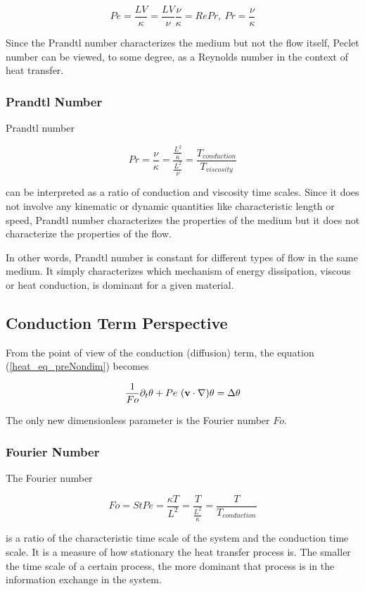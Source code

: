 $$ Pe = \frac{LV}{\kappa} = \frac{LV}{\nu} \frac{\nu}{\kappa} = RePr, ~ Pr = \frac{\nu}{\kappa} $$

Since the Prandtl number characterizes the medium but not the flow itself, Peclet number can be viewed, to some degree, as a Reynolds number in the context of heat transfer.

\subsubsection{Prandtl Number}

Prandtl number

$$ Pr = \frac{\nu}{\kappa} = \frac{\frac{L^2}{\kappa}}{\frac{L^2}{\nu}} = \frac{T_{conduction}}{T_{viscosity}} $$

can be interpreted as a ratio of conduction and viscosity time scales. Since it does not involve any kinematic or dynamic quantities like characteristic length or speed, Prandtl number characterizes the properties of the medium but it does not characterize the properties of the flow. 

In other words, Prandtl number is constant for different types of flow in the same medium. It simply characterizes which mechanism of energy dissipation, viscous or heat conduction, is dominant for a given material.

\subsection{Conduction Term Perspective}

From the point of view of the conduction (diffusion) term, the equation (\ref{heat_eq_preNondim}) becomes

\begin{equation} \label{heat_eq_diffusNondim}
\frac{1}{Fo} \partial_t\theta + Pe ~(\mathbf{v} \cdot \nabla)\theta = \Delta\theta  
\end{equation}

The only new dimensionless parameter is the Fourier number $Fo$.

\subsubsection{Fourier Number}

The Fourier number

$$ Fo = St Pe = \frac{\kappa T}{L^2} = \frac{T}{\frac{L^2}{\kappa}} = \frac{T}{T_{conduction}}$$

is a ratio of the characteristic time scale of the system and the conduction time scale. It is a measure of how stationary the heat transfer process is. The smaller the time scale of a certain process, the more dominant that process is in the information exchange in the system. 

